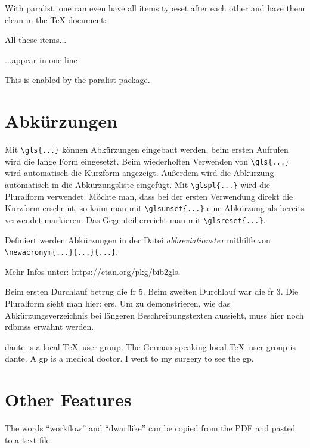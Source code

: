 \documentclass[
  numbers=autoendperiod,
  ngerman,  %
  a4paper,  %
  twoside,  %
  bibliography=totoc,
  headsepline,
  cleardoublepage=empty,
  parskip=half,
  draft=false
]{scrbook}
\theoremstyle{break}
\begin{document}
With paralist, one can even have all items typeset after each other and have them clean in the TeX document:

\begin{ltgexample}
\begin{inparaenum}
  \item All these items...
  \item ...appear in one line
  \item This is enabled by the paralist package.
\end{inparaenum}
\end{ltgexample}

\section{Abkürzungen}

Mit \verb+\gls{...}+ können Abkürzungen eingebaut werden, beim ersten Aufrufen wird die lange Form eingesetzt.
Beim wiederholten Verwenden von \verb+\gls{...}+ wird automatisch die Kurzform angezeigt.
Außerdem wird die Abkürzung automatisch in die Abkürzungsliste eingefügt.
Mit \verb+\glspl{...}+ wird die Pluralform verwendet.
Möchte man, dass bei der ersten Verwendung direkt die Kurzform erscheint, so kann man mit \verb+\glsunset{...}+ eine Abkürzung als bereits verwendet markieren.
Das Gegenteil erreicht man mit \verb+\glsreset{...}+.

Definiert werden Abkürzungen in der Datei \textit{abbreviationstex} mithilfe von \verb+\newacronym{...}{...}{...}+.

Mehr Infos unter: \url{https://ctan.org/pkg/bib2gls}.

\begin{ltgexample}
Beim ersten Durchlauf betrug die \gls{fr} 5.
Beim zweiten Durchlauf war die \gls{fr} 3.
Die Pluralform sieht man hier: \glspl{er}.
Um zu demonstrieren, wie das Abkürzungsverzeichnis bei längeren Beschreibungstexten aussieht, muss hier noch \glspl{rdbms} erwähnt werden.

\gls{dante} is a local \TeX\ user group.
The German-speaking local \TeX\ user group is \gls{dante}.
A \gls{gp} is a medical doctor.
I went to my surgery to see the \gls{gp}.
\end{ltgexample}

\section{Other Features}

\begin{ltgexample}
The words \enquote{workflow} and \enquote{dwarflike} can be copied from the PDF and pasted to a text file.
\end{ltgexample}
\end{document}
